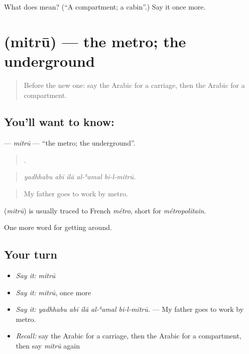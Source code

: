 \begin{tcolorbox}[breakable,colback=teal!4,colframe=teal!35!black,title={Before you move on}]
What does  mean? (\textquotedblleft{}A compartment; a cabin\textquotedblright{}.) Say it once more.
\end{tcolorbox}
\section[\texorpdfstring{\ar{مترو} (mitrū)}{مترو (mitrū)}]{ (mitrū) — the metro; the underground}

\label{lesson:AR-C428-mitru}



\begin{quote}
Before the new one: say the Arabic for a carriage, then the Arabic for a compartment.
\end{quote}

\subsection*{You'll want to know: }
\textbf{} — \emph{mitrū} — \textquotedblleft{}the metro; the underground\textquotedblright{}.

\begin{quote}
    .
\end{quote}

\begin{quote}
\emph{yadhhabu abī ilā al-ʿamal bi-l-mitrū.}
\end{quote}

\begin{quote}
My father goes to work by metro.
\end{quote}

\begin{cousinweb}
\textbf{} (\emph{mitrū}) is usually traced to French \emph{métro}, short for \emph{métropolitain}.
\end{cousinweb}

\begin{grammarlens}[title={What you've built}]
One more word for getting around.
\end{grammarlens}

\subsection*{Your turn}
\begin{itemize}
\raggedright
  \item \emph{Say it:} \emph{mitrū}
  \item \emph{Say it:} \emph{mitrū}, once more
  \item \emph{Say it:} \emph{yadhhabu abī ilā al-ʿamal bi-l-mitrū.} — My father goes to work by metro.
  \item \emph{Recall:} say the Arabic for a carriage, then the Arabic for a compartment, then say \emph{mitrū} again
\end{itemize}

